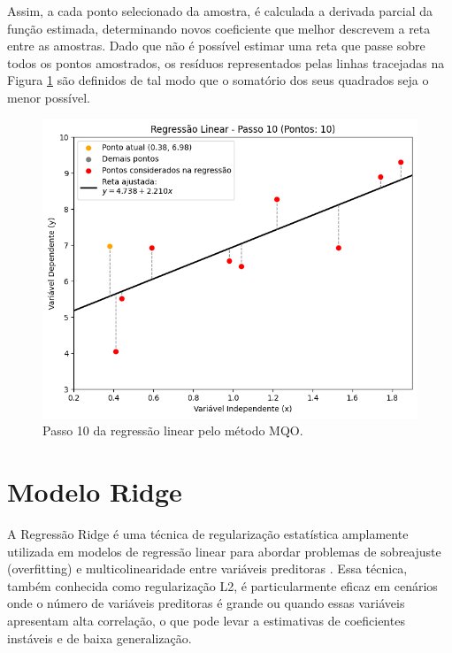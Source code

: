 Assim, a cada ponto selecionado da amostra, é calculada a derivada parcial da função estimada, determinando novos coeficiente que melhor descrevem a reta entre as amostras. Dado que não é possível estimar uma reta que passe sobre todos os pontos amostrados, os resíduos representados pelas linhas tracejadas na Figura \ref{fig:mqo_10} são definidos de tal modo que o somatório dos seus quadrados seja o menor possível.


\begin{figure}[H]
	\caption{\label{fig:mqo_10}Passo 10 da regressão linear pelo método MQO.}
	\begin{center}
		\includegraphics[scale=0.6]{figuras/RL_step_10.png}
	\end{center}
\end{figure}


\section{Modelo Ridge}

A Regressão Ridge é uma técnica de regularização estatística amplamente utilizada em modelos de regressão linear para abordar problemas de sobreajuste (overfitting) e multicolinearidade entre variáveis preditoras \cite{McDonald:2009:RR}. Essa técnica, também conhecida como regularização L2, é particularmente eficaz em cenários onde o número de variáveis preditoras é grande ou quando essas variáveis apresentam alta correlação, o que pode levar a estimativas de coeficientes instáveis e de baixa generalização.

